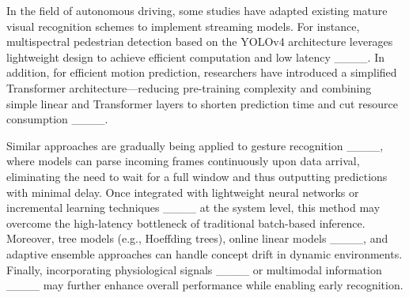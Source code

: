 In the field of autonomous driving, some studies have adapted existing mature visual recognition schemes to implement streaming models. For instance, multispectral pedestrian detection based on the YOLOv4 architecture leverages lightweight design to achieve efficient computation and low latency ____. In addition, for efficient motion prediction, researchers have introduced a simplified Transformer architecture—reducing pre-training complexity and combining simple linear and Transformer layers to shorten prediction time and cut resource consumption ____.

Similar approaches are gradually being applied to gesture recognition ____, where models can parse incoming frames continuously upon data arrival, eliminating the need to wait for a full window and thus outputting predictions with minimal delay. Once integrated with lightweight neural networks or incremental learning techniques ____ at the system level, this method may overcome the high-latency bottleneck of traditional batch-based inference. Moreover, tree models (e.g., Hoeffding trees), online linear models ____, and adaptive ensemble approaches can handle concept drift in dynamic environments. Finally, incorporating physiological signals ____ or multimodal information ____ may further enhance overall performance while enabling early recognition.